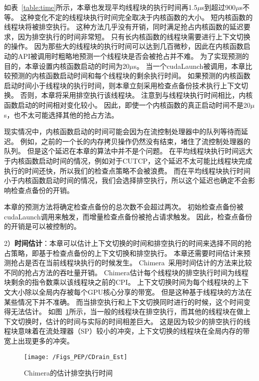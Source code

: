 如表~\ref{table:time}所示，本章也发现平均线程块的执行时间再1.5$\mu$s到超过900$\mu$s不等。
这种变化不定的线程块执行时间完全取决于内核函数的大小。
短内核函数的线程块将被排空执行。
这种方法几乎没有开销，同时满足抢占内核函数的延迟要求，因为排空执行的时间非常短。
只有长内核函数的线程块需要进行上下文切换的操作。
因为那些大的线程块的执行时间可以达到几百微秒，因此在内核函数启动的API被调用时粗略地预测一个线程块是否会被抢占并不难。
为了实现预测的目的，本章设置内核函数启动的时间为20$\mu$s。
当一个cudaLaunch被调用，本章比较预测的内核函数启动时间和每个线程块的剩余执行时间。
如果预测的内核函数启动时间小于线程块的执行时间，则本章立刻采用检查点备份技术执行上下文切换。
否则，本章将采用排空执行该线程块。
注意到与线程块执行时间相比，内核函数启动的时间相对变化较小。
因此，即使一个内核函数的真正启动时间不是20$\mu$s，也不太可能选择其他的抢占方法。

现实情况中，内核函数启动的时间可能会因为在流控制处理器中的队列等待而延迟。
例如，之前的一个长的内存拷贝操作仍然没有结束，堵住了流控制处理器的队列。
但是这个延迟在本章的算法中并不是个问题。
在平均线程块执行时间远大于内核函数启动时间的情况，例如对于CUTCP，这个延迟不太可能比线程块完成执行的时间还快，所以我们的检查点策略不会被浪费。
而在平均线程块执行时间小于内核函数启动时间的情况，我们会选择排空执行，所以这个延迟也确定不会影响检查点备份的开销。

本章的预测方法将确定检查点备份的总次数不会超过两次。
初始检查点备份被cudaLaunch调用来触发，而增量检查点备份被抢占请求触发。
因此，检查点备份的开销是可以被控制的。

2）\textbf{时间估计}：本章可以估计上下文切换的时间和排空执行的时间来选择不同的抢占策略，即基于检查点备份的上下文切换和排空执行。
本章还需要时间估计来预测抢占是否在当前线程块执行的时候发生。
Chimera~采用时间估计的方法来比较不同的抢占方法的吞吐量开销。
Chimera估计每个线程块的排空执行时间为线程块剩余的指令数乘以该线程块之前的CPI。
上下文切换时间为每个线程块的上下文大小除以全局内存被每个GPU核心分享的带宽。
但是这种基于线程块的方法在某些情况下并不准确。
而当排空执行和上下文切换同时进行的时候，这个时间变得无法估计。
如图~\ref{fig:CDrain_Est}所示，当一般的线程块在排空执行，而其他的线程块在做上下文切换时，估计的时间与实际的时间相差巨大。
这是因为较少的排空执行的线程块意味着在流处理器（SP）较小的冲突，上下文切换的线程块在全局内存的带宽上出现更多的冲突。


\begin{figure}[htbp] %
  \centering
  \texttt{[image: /Figs\_PEP/CDrain\_Est]}
  \caption{Chimera的估计排空执行时间}
  \label{fig:CDrain_Est}
\end{figure}


